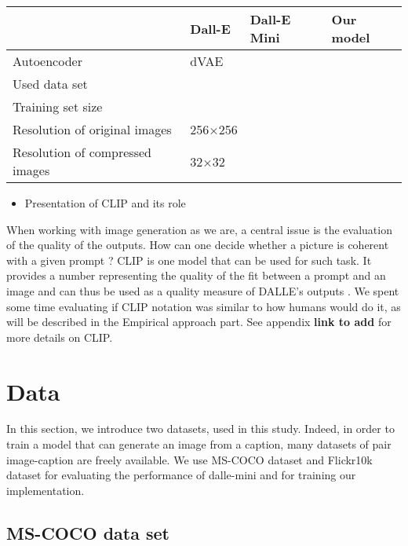 \documentclass{article}
\begin{document}
\begin{table}[h!]
    \centering
    \begin{tabular}{|l|l|l|l|}
    \hline
        ~ & Dall-E & Dall-E Mini& Our model \\ \hline
        Autoencoder & dVAE & ~ & ~ \\ \hline
        Used data set & ~ & ~ & ~ \\ \hline
        Training set size & ~ & ~ & ~ \\ \hline
        Resolution of original images & 256×256 & ~  & ~ \\ \hline
        Resolution of compressed images & 32×32 & ~ & ~ \\ \hline
    \end{tabular}
\end{table}

\begin{itemize}
    \item Presentation of CLIP and its role
\end{itemize}

When working with image generation as we are, a central issue is the evaluation of the quality of the outputs. How can one decide whether a picture is coherent with a given prompt ? CLIP is one model that can be used for such task. It provides a number representing the quality of the fit between a prompt and an image and can thus be used as a quality measure of DALLE's outputs \citet{learntransf, openaiclip}. We spent some time evaluating if CLIP notation was similar to how humans would do it, as will be described in the Empirical approach part. See appendix \textbf{link to add} for more details on CLIP. 



\pagebreak
\section{Data}

In this section, we introduce two datasets, used in this study. Indeed, in order to train a model that can generate an image from a caption, many datasets of pair image-caption are freely available. We use MS-COCO dataset and Flickr10k dataset for evaluating the performance of dalle-mini and for training our implementation.

\subsection{MS-COCO data set}
\end{document}
